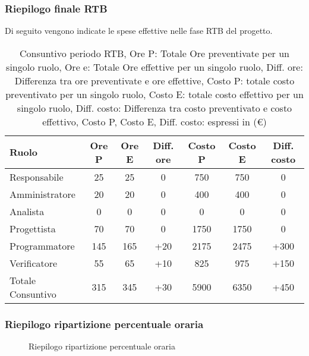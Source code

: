 \subsubsection{Riepilogo finale RTB}
Di seguito vengono indicate le spese effettive nelle fase RTB del progetto.
\begin{table}[H]
	\centering
	\begin{tabular}{l|c|c|c|c|c|c}
		\textbf{Ruolo}    & \textbf{Ore P} & \textbf{Ore E} & \textbf{Diff. ore} & \textbf{Costo P} & \textbf{Costo E} & \textbf{Diff. costo} \\
		\hline
		Responsabile      & 25             & 25             & 0                  & 750              & 750              & 0                    \\
		Amministratore    & 20             & 20             & 0                  & 400              & 400              & 0                    \\
		Analista          & 0              & 0              & 0                  & 0                & 0                & 0                    \\
		Progettista       & 70             & 70             & 0                  & 1750             & 1750             & 0                    \\
		Programmatore     & 145            & 165            & +20                & 2175             & 2475             & +300                 \\
		Verificatore      & 55             & 65             & +10                & 825              & 975              & +150                 \\
		\hline
		Totale Consuntivo & 315            & 345            & +30                & 5900             & 6350             & +450                 \\
		\hline
	\end{tabular}
	\caption{Consuntivo periodo RTB, Ore P: Totale Ore preventivate per un singolo ruolo, Ore e: Totale Ore effettive per un singolo ruolo,
		Diff. ore: Differenza tra ore preventivate e ore effettive, Costo P: totale costo preventivato per un singolo ruolo,
		Costo E: totale costo effettivo per un singolo ruolo,  Diff. costo: Differenza tra costo preventivato e costo effettivo,
		Costo P, Costo E, Diff. costo: espressi in (\euro)}
\end{table}


\subsubsection{Riepilogo ripartizione percentuale oraria}
\begin{figure}[h]
	\centering
	\caption{Riepilogo ripartizione percentuale oraria}
\end{figure}

